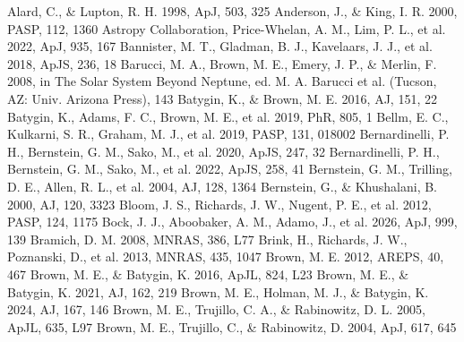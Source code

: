 \documentclass[twocolumn,linenumbers]{aastex702}
\begin{document}
\begin{thebibliography}{}
 Alard, C., \& Lupton, R. H. 1998, ApJ, 503, 325
 Anderson, J., \& King, I. R. 2000, PASP, 112, 1360
 Astropy Collaboration, Price-Whelan, A. M., Lim, P. L., et al. 2022, ApJ, 935, 167
 Bannister, M. T., Gladman, B. J., Kavelaars, J. J., et al. 2018, ApJS, 236, 18
 Barucci, M. A., Brown, M. E., Emery, J. P., \& Merlin, F. 2008, in The Solar System Beyond Neptune, ed. M. A. Barucci et al. (Tucson, AZ: Univ. Arizona Press), 143
 Batygin, K., \& Brown, M. E. 2016, AJ, 151, 22
 Batygin, K., Adams, F. C., Brown, M. E., et al. 2019, PhR, 805, 1
 Bellm, E. C., Kulkarni, S. R., Graham, M. J., et al. 2019, PASP, 131, 018002
 Bernardinelli, P. H., Bernstein, G. M., Sako, M., et al. 2020, ApJS, 247, 32
 Bernardinelli, P. H., Bernstein, G. M., Sako, M., et al. 2022, ApJS, 258, 41
 Bernstein, G. M., Trilling, D. E., Allen, R. L., et al. 2004, AJ, 128, 1364
 Bernstein, G., \& Khushalani, B. 2000, AJ, 120, 3323
 Bloom, J. S., Richards, J. W., Nugent, P. E., et al. 2012, PASP, 124, 1175
 Bock, J. J., Aboobaker, A. M., Adamo, J., et al. 2026, ApJ, 999, 139
 Bramich, D. M. 2008, MNRAS, 386, L77
 Brink, H., Richards, J. W., Poznanski, D., et al. 2013, MNRAS, 435, 1047
 Brown, M. E. 2012, AREPS, 40, 467
 Brown, M. E., \& Batygin, K. 2016, ApJL, 824, L23
 Brown, M. E., \& Batygin, K. 2021, AJ, 162, 219
 Brown, M. E., Holman, M. J., \& Batygin, K. 2024, AJ, 167, 146
 Brown, M. E., Trujillo, C. A., \& Rabinowitz, D. L. 2005, ApJL, 635, L97
 Brown, M. E., Trujillo, C., \& Rabinowitz, D. 2004, ApJ, 617, 645

\end{thebibliography}
\end{document}
